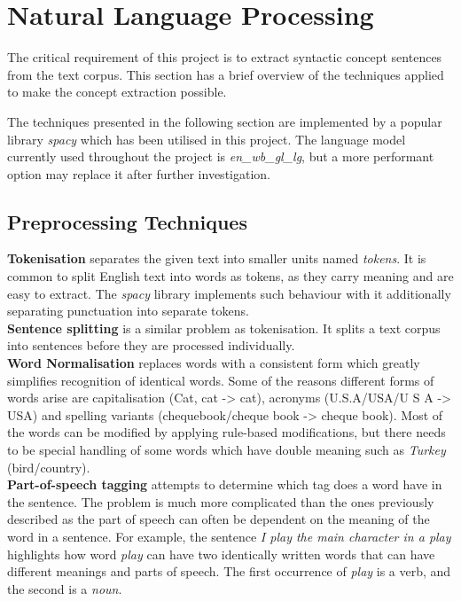 
\section{Natural Language Processing}

The critical requirement of this project is to extract syntactic concept sentences from the text corpus.
This section has a brief overview of the techniques applied to make the concept extraction possible.

The techniques presented in the following section are implemented by a popular library \emph{spacy} \cite{RefWorks:RefID:24-spacy} which has been utilised in this project. 
The language model currently used throughout the project is \emph{en\_wb\_gl\_lg}, but a more performant option may replace it after further investigation.

\subsection{Preprocessing Techniques}

\textbf{Tokenisation} separates the given text into smaller units named \emph{tokens}. 
It is common to split English text into words as tokens, as they carry meaning and are easy to extract.
The \emph{spacy} library implements such behaviour with it additionally separating punctuation into separate tokens.\\

\textbf{Sentence splitting} is a similar problem as tokenisation. It splits a text corpus into sentences before they are processed individually. \\

\textbf{Word Normalisation} replaces words with a consistent form which greatly simplifies recognition of identical words.
Some of the reasons different forms of words arise are capitalisation (Cat, cat -> cat), acronyms (U.S.A/USA/U S A -> USA) and spelling variants (chequebook/cheque book -> cheque book). 
Most of the words can be modified by applying rule-based modifications, but there needs to be special handling of some words which have double meaning such as \emph{Turkey} (bird/country). \\


\textbf{Part-of-speech tagging} attempts to determine which tag does a word have in the sentence.
The problem is much more complicated than the ones previously described as the part of speech can often be dependent on the meaning of the word in a sentence.
For example, the sentence \emph{I play the main character in a play} highlights how word \emph{play} can have two identically written words that can have different meanings and parts of speech.
The first occurrence of \emph{play} is a verb, and the second is a \emph{noun}.

